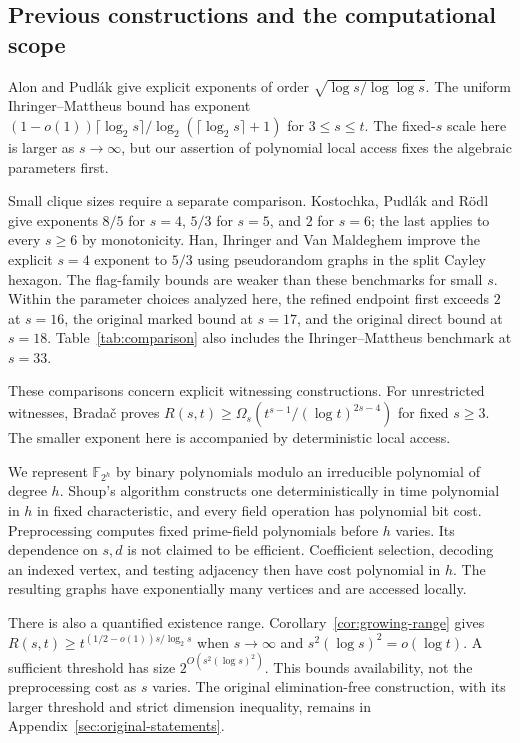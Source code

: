 \documentclass[11pt,a4paper]{article}
\newcommand{\F}{\mathbb F}
\theoremstyle{definition}
\theoremstyle{remark}
\numberwithin{equation}{section}
\begin{document}
\subsection{Previous constructions and the computational scope}
Alon and Pudl\'ak \cite{AP} give explicit exponents of order $\sqrt{\log s/\log\log s}$. The uniform Ihringer--Mattheus bound \cite[Theorem 1.3]{IM} has exponent $(1-o(1))\lceil\log_2s\rceil/\log_2(\lceil\log_2s\rceil+1)$ for $3\le s\le t$. The fixed-$s$ scale here is larger as $s\to\infty$, but our assertion of polynomial local access fixes the algebraic parameters first.

Small clique sizes require a separate comparison. Kostochka, Pudl\'ak and R\"odl \cite{KPR} give exponents $8/5$ for $s=4$, $5/3$ for $s=5$, and $2$ for $s=6$; the last applies to every $s\ge6$ by monotonicity. Han, Ihringer and Van Maldeghem \cite{HIV} improve the explicit $s=4$ exponent to $5/3$ using pseudorandom graphs in the split Cayley hexagon. The flag-family bounds are weaker than these benchmarks for small $s$. Within the parameter choices analyzed here, the refined endpoint first exceeds $2$ at $s=16$, the original marked bound at $s=17$, and the original direct bound at $s=18$. Table~\ref{tab:comparison} also includes the Ihringer--Mattheus benchmark at $s=33$.

These comparisons concern explicit witnessing constructions. For unrestricted witnesses, Brada\v{c} \cite{Bradac} proves $R(s,t)\ge\Omega_s(t^{s-1}/(\log t)^{2s-4})$ for fixed $s\ge3$. The smaller exponent here is accompanied by deterministic local access.

We represent $\F_{2^h}$ by binary polynomials modulo an irreducible polynomial of degree $h$. Shoup's algorithm \cite{Shoup} constructs one deterministically in time polynomial in $h$ in fixed characteristic, and every field operation has polynomial bit cost. Preprocessing computes fixed prime-field polynomials before $h$ varies. Its dependence on $s,d$ is not claimed to be efficient. Coefficient selection, decoding an indexed vertex, and testing adjacency then have cost polynomial in $h$. The resulting graphs have exponentially many vertices and are accessed locally.

There is also a quantified existence range. Corollary~\ref{cor:growing-range} gives $R(s,t)\ge t^{(1/2-o(1))s/\log_2s}$ when $s\to\infty$ and $s^2(\log s)^2=o(\log t)$. A sufficient threshold has size $2^{O(s^2(\log s)^2)}$. This bounds availability, not the preprocessing cost as $s$ varies. The original elimination-free construction, with its larger threshold and strict dimension inequality, remains in Appendix~\ref{sec:original-statements}.
\end{document}
